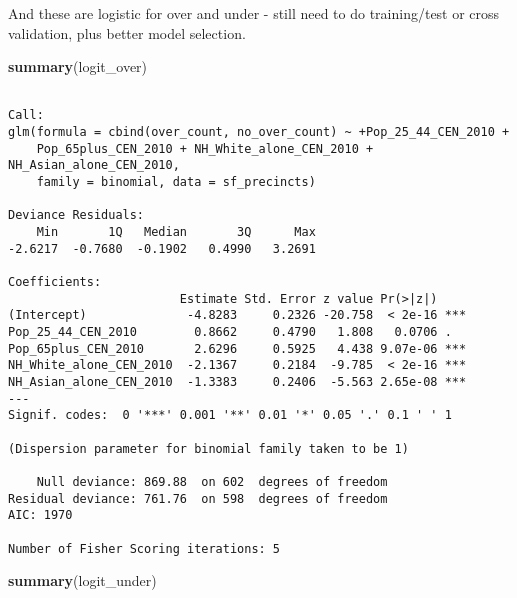 \documentclass[12pt,twoside]{reedthesis}
\newenvironment{Shaded}{\begin{snugshade}}{\end{snugshade}}
\newcommand{\KeywordTok}[1]{\textcolor[rgb]{0.13,0.29,0.53}{\textbf{#1}}}
\newcommand{\NormalTok}[1]{#1}
\theoremstyle{definition}
\theoremstyle{definition}
\theoremstyle{definition}
\theoremstyle{remark}
\begin{document}
And these are logistic for over and under - still need to do
training/test or cross validation, plus better model selection.
\begin{Shaded}
\begin{Highlighting}[]
\KeywordTok{summary}\NormalTok{(logit_over)}
\end{Highlighting}
\end{Shaded}
\begin{verbatim}

Call:
glm(formula = cbind(over_count, no_over_count) ~ +Pop_25_44_CEN_2010 + 
    Pop_65plus_CEN_2010 + NH_White_alone_CEN_2010 + NH_Asian_alone_CEN_2010, 
    family = binomial, data = sf_precincts)

Deviance Residuals: 
    Min       1Q   Median       3Q      Max  
-2.6217  -0.7680  -0.1902   0.4990   3.2691  

Coefficients:
                        Estimate Std. Error z value Pr(>|z|)    
(Intercept)              -4.8283     0.2326 -20.758  < 2e-16 ***
Pop_25_44_CEN_2010        0.8662     0.4790   1.808   0.0706 .  
Pop_65plus_CEN_2010       2.6296     0.5925   4.438 9.07e-06 ***
NH_White_alone_CEN_2010  -2.1367     0.2184  -9.785  < 2e-16 ***
NH_Asian_alone_CEN_2010  -1.3383     0.2406  -5.563 2.65e-08 ***
---
Signif. codes:  0 '***' 0.001 '**' 0.01 '*' 0.05 '.' 0.1 ' ' 1

(Dispersion parameter for binomial family taken to be 1)

    Null deviance: 869.88  on 602  degrees of freedom
Residual deviance: 761.76  on 598  degrees of freedom
AIC: 1970

Number of Fisher Scoring iterations: 5
\end{verbatim}
\begin{Shaded}
\begin{Highlighting}[]
\KeywordTok{summary}\NormalTok{(logit_under)}
\end{Highlighting}
\end{Shaded}
\end{document}
